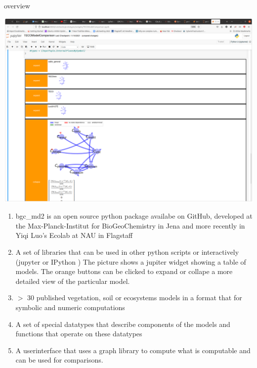 \documentclass[96pt]{article}
\begin{document}
\begin{tcbposter}
{\begin{multicols*}{4}
  
\begin{mybox}{overview}
\end{mybox}
	\includegraphics[width=\columnwidth]{ModelTable.png}
	\begin{enumerate}
	\item
	bgc\_md2 is an open source python package availabe on GitHub, developed at the Max-Planck-Institut for BioGeoChemistry in Jena and more recently  in Yiqi Luo's Ecolab at NAU in Flagstaff
	\item
	A set of libraries that can be used in other python scripts or interactively (jupyter or IPython )
	The picture shows a jupiter widget showing a table of models. The orange buttons can be clicked to 
	expand or collape a more detailed view of the particular model.
	\item
	$>$ 30 published vegetation, soil or ecosystems models in a format that
	for symbolic and numeric computations
	\item
	A set of special datatypes that describe components of the models and functions that operate on these datatypes
	\item 
	A userinterface that uses a graph library to compute what is computable and can be used for comparisons.
	\end{enumerate}


\end{multicols*}}
\end{tcbposter}
\end{document}
